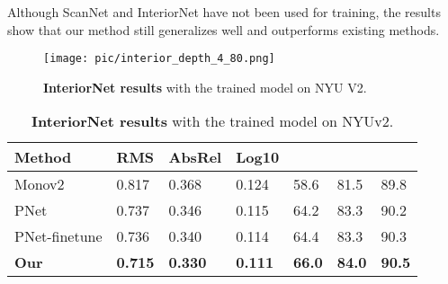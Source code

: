 \documentclass[10pt,twocolumn,letterpaper]{article}
\begin{document}
Although ScanNet and InteriorNet have not been used for training, the results show that our method still generalizes well and outperforms existing methods.

\begin{figure}[ht]                        
	\centering                                          
	\texttt{[image: pic/interior\_depth\_4\_80.png]} \caption{\textbf{InteriorNet results} with the trained model on NYU V2.}	\label{Fig:interior depth}
\end{figure}

\begin{table}[h]
	\scriptsize
	\centering
	\begin{tabularx}{0.48\textwidth}{|l|XXX|XXX|}
		\hline
		Method & RMS & AbsRel & Log10 &  &  &  \\
		\hline
		Monov2\cite{godard2019digging} & 0.817 & 0.368  & 0.124 & 58.6  & 81.5  & 89.8 \\
		
		PNet \cite{yu2020p} & 0.737  & 0.346 & 0.115 & 64.2    & 83.3  & 90.2 \\
		
		PNet-finetune  & 0.736  & 0.340 & 0.114 & 64.4    & 83.3  & 90.3 \\
		
\textbf{Our}   & \textbf{0.715} & \textbf{0.330} & \textbf{0.111} & \textbf{66.0}  & \textbf{84.0}  & \textbf{90.5} \\
		\hline
	\end{tabularx}
	\newline
	\caption{\textbf{InteriorNet results} with the trained model on NYUv2.}
	\label{tab:interiornet}
\end{table}
\end{document}
